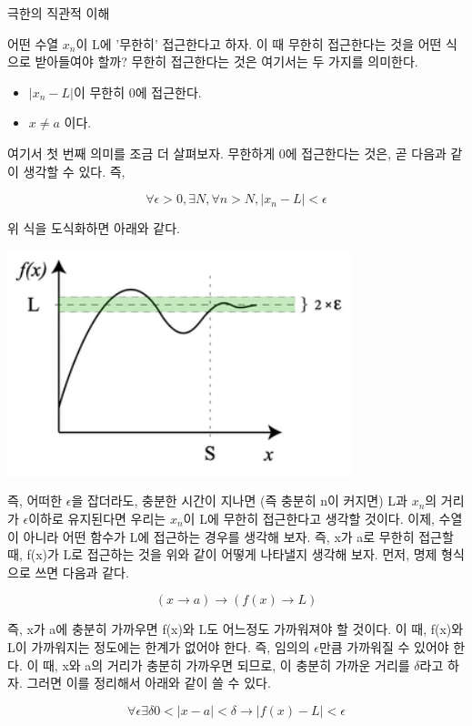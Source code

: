 \documentclass{beamer}
\begin{document}
\begin{frame}[allowframebreaks]{극한의 직관적 이해}

어떤 수열 $x_n$이 L에 '무한히' 접근한다고 하자. 이 때 무한히 접근한다는 것을 어떤 식으로 받아들여야 할까? 무한히 접근한다는 것은 여기서는 두 가지를 의미한다. 
\begin{itemize} 
\item $|x_n-L|$이 무한히 0에 접근한다. 
\item $x \neq a$ 이다. 
\end{itemize}

여기서 첫 번째 의미를 조금 더 살펴보자. 무한하게 0에 접근한다는 것은, 곧 다음과 같이 생각할 수 있다. 즉, 

\begin{equation} 
\forall \epsilon>0, \exists N, \forall n>N, |x_n-L| < \epsilon
\end{equation}

위 식을 도식화하면 아래와 같다. 

\includegraphics[width=10cm,keepaspectratio]{limit}

즉, 어떠한 $\epsilon$을 잡더라도, 충분한 시간이 지나면 (즉 충분히 n이 커지면) L과 $x_n$의 거리가 $\epsilon$이하로 유지된다면 우리는 $x_n$이 L에 무한히 접근한다고 생각할 것이다. 이제, 수열이 아니라 어떤 함수가 L에 접근하는 경우를 생각해 보자. 즉, x가 a로 무한히 접근할 때, f(x)가 L로 접근하는 것을 위와 같이 어떻게 나타낼지 생각해 보자. 먼저, 명제 형식으로 쓰면 다음과 같다. 

\begin{equation} 
(x \rightarrow a ) \rightarrow (f(x) \rightarrow L)
\end{equation}

즉, x가 a에 충분히 가까우면 f(x)와 L도 어느정도 가까워져야 할 것이다. 이 때, f(x)와 L이 가까워지는 정도에는 한계가 없어야 한다. 즉, 임의의 $\epsilon$만큼 가까워질 수 있어야 한다. 이 때, x와 a의 거리가 충분히 가까우면 되므로, 이 충분히 가까운 거리를 $\delta$라고 하자. 그러면 이를 정리해서 아래와 같이 쓸 수 있다. 

\begin{equation} 
\forall \epsilon \exists \delta 0<|x-a|<\delta \rightarrow |f(x)-L|< \epsilon
\end{equation}

\end{frame} 
\end{document}
